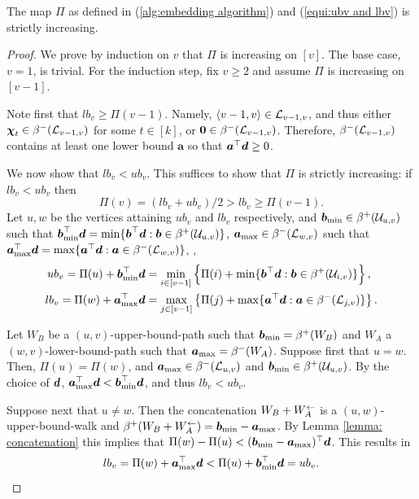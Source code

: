 \documentclass[runningheads]{llncs}
\begin{document}
\begin{lemma}\label{lemma:lb<ub}
The map $\Pi$ as defined in (\ref{alg:embedding algorithm}) and (\ref{equi:ubv and lbv}) is strictly increasing.

\end{lemma}
\begin{proof} 
We prove by induction on $v$ that $\Pi$ is increasing on $[v]$. The base case, $v=1$, is trivial. For the induction step, fix $v\geq 2$ and assume $\Pi$ is increasing on $[v-1]$.

Note first that $lb_v\geq \Pi(v-1)$. Namely, $\path{v-1,v}\in \lowerbdpath {v-1}v$, and thus either $\bm{\chi}_t\in \lowerbd {v-1}v$ for some $t\in [k]$, or $\bm{0}\in \lowerbd {v-1}v$. Therefore,
$\lowerbd {v-1}v$ contains at least one lower bound $\bm{a}$ so that  $\bma^\top \bmd \geq 0$.


We now show that $lb_v<ub_v$. This suffices to show that $\Pi$ is strictly increasing: if $lb_v<ub_v$ then %
$$\Pi(v)=(lb_v+ub_v)/2>lb_v\geq \Pi(v-1).
$$
Let $u, w$ be the vertices attaining $ub_v$ and $lb_v$ respectively,
and 
$\bmb_{\min}\in\upperbd uv$ such that 
$\bmb_{\min}^\top\bmd=\min\{\bmb^\top\bmd:\bmb\in\upperbd uv\}$, 
$\bma_{\max}\in\lowerbd wv$ such that 
$\bma_{\max}^\top\bmd=\max\{\bma^\top\bmd:\bma\in\lowerbd wv\}$, \ie,
\begin{equation*}\begin{split}
     ub_v = \Pi(u) + \bmb_{\min}^\top\bmd &= \min_{i\in[v-1]}\left\{ \Pi(i)+ \min\{\bmb^\top\bmd: \bmb\in\upperbd iv\} \right\},   \\
     lb_v = \Pi(w) + \bma_{\max}^\top\bmd & =\max_{j\in[v-1]}\left\{ \Pi(j)+ \max\{\bma^\top\bmd: \bma\in\lowerbd jv\} \right\}.
\end{split}\end{equation*}


Let $W_B$  be a $(u,v)$-upper-bound-path such that $\bmb_{\min} = \beta^+(W_B)$ and $W_A$ a $(w,v)$-lower-bound-path such that $\bma_{\max} = \beta^-(W_A)$. 
    Suppose first that $u=w$.
    Then, $\Pi(u)=\Pi(w)$, and $\bma_{\max}\in\lowerbd uv$ and $\bmb_{\min}\in\upperbd uv$. By the choice of $\bmd$, $\bma_{\max}^\top \bmd<\bmb_{\min}^\top \bmd$, and thus $lb_v < ub_v$.
    
    Suppose next that $u\not= w$. Then the concatenation $W_B + W_A\rev{}$ is a $(u,w)$-upper-bound-walk and $\beta^+( W_B + \reverse{W_A}) = \bmb_{\min} - \bma_{\max}$. By Lemma \ref{lemma: concatenation} this implies that  $\dist uw < (\bmb_{\min}-\bma_{\max})^\top\bmd$. This results in
    $$lb_v = \Pi(w)+\bma_{\max}^\top\bmd < \Pi(u) + \bmb_{\min}^\top\bmd = ub_v.$$

\end{proof}
\end{document}
